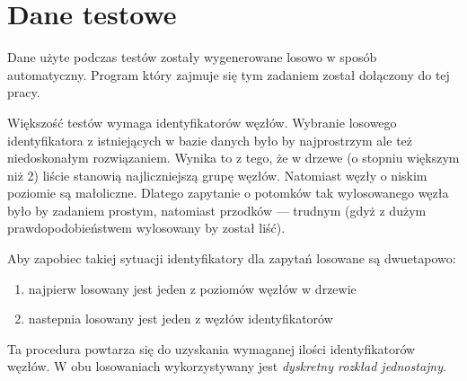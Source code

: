 

% 



\section{Dane testowe}

Dane użyte podczas testów zostały wygenerowane losowo w sposób automatyczny. 
Program który zajmuje się tym zadaniem został dołączony do tej pracy.




Większość testów wymaga identyfikatorów węzłów. 
Wybranie losowego identyfikatora z istniejących w bazie danych było by najprostrzym 
ale też niedoskonałym rozwiązaniem.
Wynika to z tego, że w drzewe (o stopniu większym niż 2) 
liście stanowią najliczniejszą grupę węzłów.
Natomiast węzły o niskim poziomie są małoliczne.
Dlatego zapytanie o potomków tak wylosowanego węzła było by zadaniem prostym, natomiast przodków --- trudnym (gdyż z dużym prawdopodobieństwem wylosowany by został liść).

Aby zapobiec takiej sytuacji identyfikatory dla zapytań losowane są dwuetapowo:
\begin{enumerate}
 \item najpierw losowany jest jeden z poziomów węzłów w drzewie
 \item nastepnia losowany jest jeden z węzłów identyfikatorów
\end{enumerate}
Ta procedura powtarza się do uzyskania wymaganej ilości identyfikatorów węzłów. 
W obu losowaniach wykorzystywany jest \emph{dyskretny rozkład jednostajny}. 






